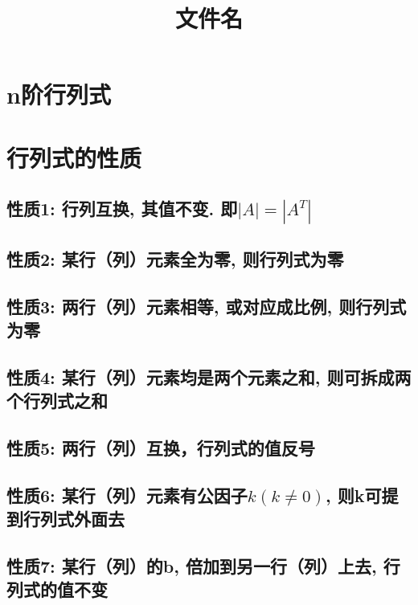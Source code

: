 \documentclass[UTF8]{ctexart}
\title{文件名}
\begin{document}
	\tableofcontents %
	\date{} %
	\maketitle  %
	
	\section{n阶行列式}
	
	
	\section{行列式的性质}
	
	\subsection{性质1: 行列互换, 其值不变. 即$|A|=\left| A^T \right|$}
	
	\subsection{性质2: 某行（列）元素全为零, 则行列式为零}
	
	\subsection{性质3: 两行（列）元素相等, 或对应成比例, 则行列式为零}
	
	\subsection{性质4: 某行（列）元素均是两个元素之和, 则可拆成两个行列式之和}
	
	\subsection{性质5: 两行（列）互换，行列式的值反号}
	
	\subsection{性质6: 某行（列）元素有公因子$k\left( k\ne 0 \right) $, 则k可提到行列式外面去 }
	
	\subsection{性质7: 某行（列）的b, 倍加到另一行（列）上去, 行列式的值不变 }
	
\end{document}
